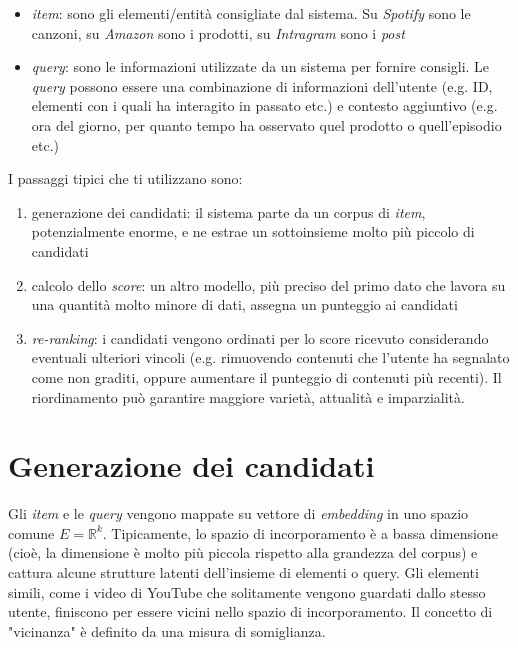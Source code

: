 \begin{itemize}
    \item \textit{item}: sono gli elementi/entità consigliate dal sistema. Su \textit{Spotify} sono le canzoni, su \textit{Amazon} sono i prodotti, su \textit{Intragram} sono i \textit{post}
    \item \textit{query}: sono le informazioni utilizzate da un sistema per fornire consigli. Le \textit{query} possono essere una combinazione di informazioni dell'utente (e.g. ID, elementi con i quali ha interagito in passato etc.) e contesto aggiuntivo (e.g. ora del giorno, per quanto tempo ha osservato quel prodotto o quell'episodio etc.)
\end{itemize}

I passaggi tipici che ti utilizzano sono: 

\begin{enumerate}
    \item generazione dei candidati: il sistema parte da un corpus di \textit{item}, potenzialmente enorme, e ne estrae un sottoinsieme molto più piccolo di candidati
    \item calcolo dello \textit{score}: un altro modello, più preciso del primo dato che lavora su una quantità molto minore di dati, assegna un punteggio ai candidati
    \item \textit{re-ranking}: i candidati vengono ordinati per lo score ricevuto considerando eventuali ulteriori vincoli (e.g. rimuovendo contenuti che l'utente ha segnalato come non graditi, oppure aumentare il punteggio di contenuti più recenti). Il riordinamento può garantire maggiore varietà, attualità e imparzialità.
\end{enumerate}

\section{Generazione dei candidati}

Gli \textit{item} e le \textit{query} vengono mappate su  vettore di \textit{embedding} in uno spazio comune $E = \mathbb{R}^k$. Tipicamente, lo spazio di incorporamento è a bassa dimensione (cioè, la dimensione è molto più piccola rispetto alla grandezza del corpus) e cattura alcune strutture latenti dell'insieme di elementi o query. Gli elementi simili, come i video di YouTube che solitamente vengono guardati dallo stesso utente, finiscono per essere vicini nello spazio di incorporamento. Il concetto di "vicinanza" è definito da una misura di somiglianza.


